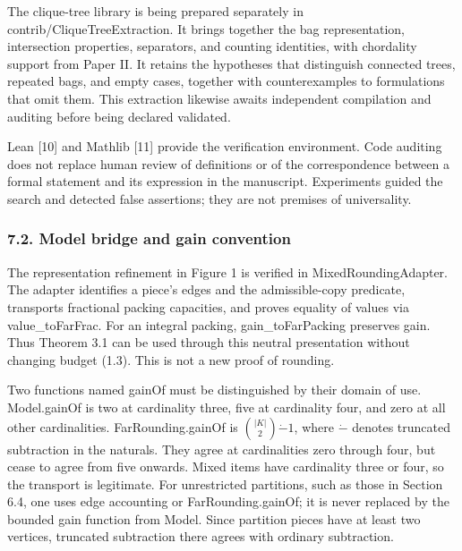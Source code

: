 \documentclass[english,11pt,a4paper]{article}
\begin{document}
The clique-tree library is being prepared separately in {\ttfamily\small contrib/\discretionary{\hbox{\ensuremath{\hookrightarrow}}}{}{}CliqueTreeEx\discretionary{\hbox{\ensuremath{\hookrightarrow}}}{}{}traction}. It brings together the bag representation, intersection properties, separators, and counting identities, with chordality support from Paper II. It retains the hypotheses that distinguish connected trees, repeated bags, and empty cases, together with counterexamples to formulations that omit them. This extraction likewise awaits independent compilation and auditing before being declared validated.

Lean {[}10{]} and Mathlib {[}11{]} provide the verification environment. Code auditing does not replace human review of definitions or of the correspondence between a formal statement and its expression in the manuscript. Experiments guided the search and detected false assertions; they are not premises of universality.

\subsubsection{7.2. Model bridge and gain convention}\label{model-bridge-and-gain-convention}

The representation refinement in Figure 1 is verified in {\ttfamily\small MixedRoundin\discretionary{\hbox{\ensuremath{\hookrightarrow}}}{}{}gAdapter}. The adapter identifies a piece's edges and the admissible-copy predicate, transports fractional packing capacities, and proves equality of values via {\ttfamily\small value\_\discretionary{\hbox{\ensuremath{\hookrightarrow}}}{}{}toFarFrac}. For an integral packing, {\ttfamily\small gain\_\discretionary{\hbox{\ensuremath{\hookrightarrow}}}{}{}toFarPacking} preserves gain. Thus Theorem 3.1 can be used through this neutral presentation without changing budget (1.3). This is not a new proof of rounding.

Two functions named {\ttfamily\small gainOf} must be distinguished by their domain of use. {\ttfamily\small Model.\discretionary{\hbox{\ensuremath{\hookrightarrow}}}{}{}gainOf} is two at cardinality three, five at cardinality four, and zero at all other cardinalities. {\ttfamily\small FarRounding.\discretionary{\hbox{\ensuremath{\hookrightarrow}}}{}{}gainOf} is \(\binom{|K|}{2}\mathbin{\dot-}1\), where \(\dot-\) denotes truncated subtraction in the naturals. They agree at cardinalities zero through four, but cease to agree from five onwards. Mixed items have cardinality three or four, so the transport is legitimate. For unrestricted partitions, such as those in Section 6.4, one uses edge accounting or {\ttfamily\small FarRounding.\discretionary{\hbox{\ensuremath{\hookrightarrow}}}{}{}gainOf}; it is never replaced by the bounded gain function from {\ttfamily\small Model}. Since partition pieces have at least two vertices, truncated subtraction there agrees with ordinary subtraction.
\end{document}
